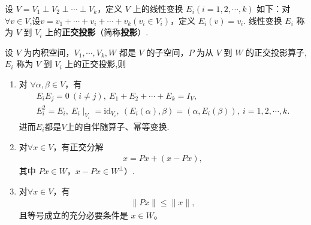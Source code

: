\documentclass[../../main.tex]{subfiles}%
\begin{document}
\begin{definition}[正交投影]
设 $V = V_1 \perp V_2 \perp \cdots \perp V_k$，定义 $V$ 上的线性变换 $E_i (i = 1, 2, \cdots, k)$ 如下：对$\forall v\in V$,设$v = v_1 + \cdots + v_i + \cdots + v_k (v_i \in V_i)$，定义 $E_i(v) = v_i$. 
线性变换 $E_i$ 称为 $V$ 到 $V_i$ 上的\textbf{正交投影}（简称\textbf{投影}）.
\end{definition}

\begin{theorem}\label{theorem:正交投影的性质}
设 \(V\) 为内积空间，\(V_1,\cdots,V_k,W\) 都是 \(V\) 的子空间，\(P\) 为从 \(V\) 到 \(W\) 的正交投影算子,$E_i$ 称为 $V$ 到 $V_i$ 上的正交投影,则
\begin{enumerate}[(1)]
\item\label{theorem:正交投影的性质-1} 对 $\forall \alpha, \beta \in V$，有
\begin{gather*}
E_iE_j = 0\ (i \neq j), \ E_1 + E_2 + \cdots + E_k = I_V,\\
E_i^2 = E_i,\ E_i\mid_{V_i}=\text{id}_{V_i},\ (E_i(\alpha), \beta) = (\alpha, E_i(\beta)),\ i=1,2,\cdots,k.
\end{gather*}
进而$E_i$都是$V$上的自伴随算子、幂等变换.

\item\label{theorem:正交投影的性质-2} 对\(\forall x \in V\)，有正交分解
\begin{align*}
x = Px + (x-Px),
\end{align*}
其中 \(Px \in W\)，\(x-Px \in W^\perp\)）.

\item\label{theorem:正交投影的性质-3} 对\(\forall x \in V\)，有
\begin{align*}
\|P x\| \leqslant \|x\|,
\end{align*}
且等号成立的充分必要条件是 \(x \in W\)。
\end{enumerate}
\end{theorem}
\end{document}
